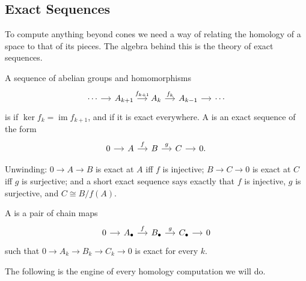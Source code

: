 \subsection{Exact Sequences}

To compute anything beyond cones we need a way of relating the homology of a space to
that of its pieces. The algebra behind this is the theory of exact sequences.

\begin{definition}
	A sequence of abelian groups and homomorphisms
	\[\begin{tikzcd}[column sep=small]
		\cdots \arrow[r] & {A_{k+1}} \arrow[r, "{f_{k+1}}"] & {A_k} \arrow[r, "{f_k}"] & {A_{k-1}} \arrow[r] & \cdots
	\end{tikzcd}\]
	is  if $\ker f_k = \operatorname{im}f_{k+1}$, and  if it is exact everywhere. A  is an exact sequence of the form
	\[\begin{tikzcd}[column sep=small]
		0 \arrow[r] & A \arrow[r, "f"] & B \arrow[r, "g"] & C \arrow[r] & 0 .
	\end{tikzcd}\]
\end{definition}

Unwinding: $0 \to A \to B$ is exact at $A$ iff $f$ is injective; $B \to C \to 0$ is exact
at $C$ iff $g$ is surjective; and a short exact sequence says exactly that $f$ is
injective, $g$ is surjective, and $C \cong B/f(A)$.

\begin{definition}
	A  is a pair of chain maps
	\[\begin{tikzcd}[column sep=small]
		0 \arrow[r] & {A_\bullet} \arrow[r, "f"] & {B_\bullet} \arrow[r, "g"] & {C_\bullet} \arrow[r] & 0
	\end{tikzcd}\]
	such that $0 \to A_k \to B_k \to C_k \to 0$ is exact for every $k$.
\end{definition}

The following is the engine of every homology computation we will do.

